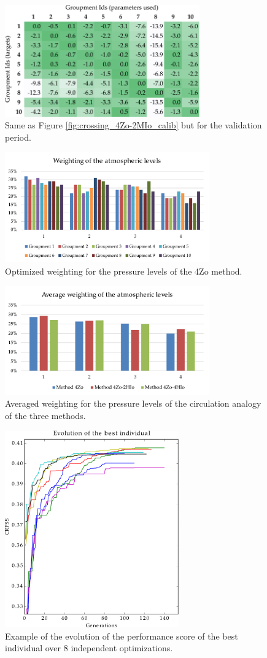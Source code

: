 \documentclass[review]{elsarticle}
\begin{document}
\begin{figure}[htb]
	\centerline{\includegraphics[width=8.4cm]{figures/fig14.pdf}}
	\caption{Same as Figure \ref{fig:crossing_4Zo-2MIo_calib} but for the validation period.}
	\label{fig:crossing_4Zo-2MIo_valid}
\end{figure}

\begin{figure}[htb]
	\centerline{\includegraphics[width=8.8cm]{figures/fig15.pdf}}
	\caption{Optimized weighting for the pressure levels of the 4Zo method.}
	\label{fig:levels_weights}
\end{figure}

\begin{figure}[htb]
	\centerline{\includegraphics[width=8.8cm]{figures/fig16.pdf}}
	\caption{Averaged weighting for the pressure levels of the circulation analogy of the three methods.}
	\label{fig:levels_weights_average}
\end{figure}

\begin{figure}[htb]
	\centerline{\includegraphics[width=7.5cm]{figures/fig17.pdf}}
	\caption{Example of the evolution of the performance score of the best individual over 8 independent optimizations.}
	\label{fig:evolution}
\end{figure}
\end{document}
